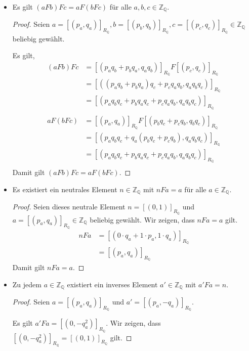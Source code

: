 \documentclass[12pt]{extarticle}
\begin{document}
\begin{itemize}
\item Es gilt \((aFb)Fc=aF(bFc)\) für alle
  \(a,b,c \in \mathbb{Z}_{\mathbb{Q}}\).
  \begin{proof}
    Seien $a = [(p_a,q_a)]_{R_{\mathbb{Q}}}, b =
    [(p_b,q_b)]_{R_{\mathbb{Q}}}, c = [(p_c,q_c)]_{R_{\mathbb{Q}}} \in
    \mathbb{Z}_{\mathbb{Q}}$ beliebig gewählt.

    Es gilt,
\begin{align*}
  (aFb)Fc
  &=
     [(p_aq_b+p_bq_a,q_aq_b)]_{R_{\mathbb{Q}}}F[(p_c,q_c)]_{R_{\mathbb{Q}}}\\
  &= [((p_aq_b+p_bq_a)q_c+p_cq_aq_b,q_aq_bq_c)]_{R_{\mathbb{Q}}}\\
  &= [(p_aq_bq_c+p_bq_aq_c+p_cq_aq_b,q_aq_bq_c)]_{R_{\mathbb{Q}}}\\
  \\
  aF(bFc)
  &=[(p_a,q_a)]_{R_{\mathbb{Q}}}F[(p_bq_c+p_cq_b,q_bq_c)]_{R_{\mathbb{Q}}}\\
  &= [(p_aq_bq_c+q_a(p_bq_c+p_cq_b),q_aq_bq_c)]_{R_{\mathbb{Q}}}\\
  &= [(p_aq_bq_c+p_bq_aq_c+p_cq_aq_b,q_aq_bq_c)]_{R_{\mathbb{Q}}}\\
\end{align*}
Damit gilt \((aFb)Fc=aF(bFc)\).
  \end{proof}
\item Es existiert ein neutrales Element
  \(n \in \mathbb{Z}_{\mathbb{Q}}\) mit \(nFa=a\) für alle
  \(a \in \mathbb{Z}_{\mathbb{Q}}\).

  \begin{proof}
    Seien dieses neutrale Element \(n = [(0,1)]_{R_{\mathbb{Q}}}\) und
    \(a = [(p_a,q_a)]_{R_{\mathbb{Q}}} \in \mathbb{Z}_{\mathbb{Q}}\)
    beliebig gewählt.  Wir zeigen, dass \(nFa=a\) gilt.
\begin{align*}
  nFa &= [(0\cdot q_a + 1\cdot p_a, 1\cdot q_a)]_{R_{\mathbb{Q}}}\\
      &= [(p_a,q_a)]_{R_{\mathbb{Q}}}
\end{align*}
Damit gilt \(nFa = a\).
  \end{proof}
\item Zu jedem \(a \in \mathbb{Z}_{\mathbb{Q}}\) existiert ein inverses
  Element \(a' \in \mathbb{Z}_{\mathbb{Q}}\) mit \(a'Fa=n\).
  \begin{proof}
    Seien \(a = [(p_a,q_a)]_{R_{\mathbb{Q}}}\) und $a' =
    [(p_a,-q_a)]_{R_{\mathbb{Q}}}$.

    Es gilt \(a'Fa=[(0,-q_a^2)]_{R_{\mathbb{Q}}}\).  Wir zeigen, dass
    \([(0,-q_a^2)]_{R_{\mathbb{Q}}} = [(0,1)]_{R_{\mathbb{Q}}}\) gilt.


\end{proof}
\end{itemize}
\end{document}
